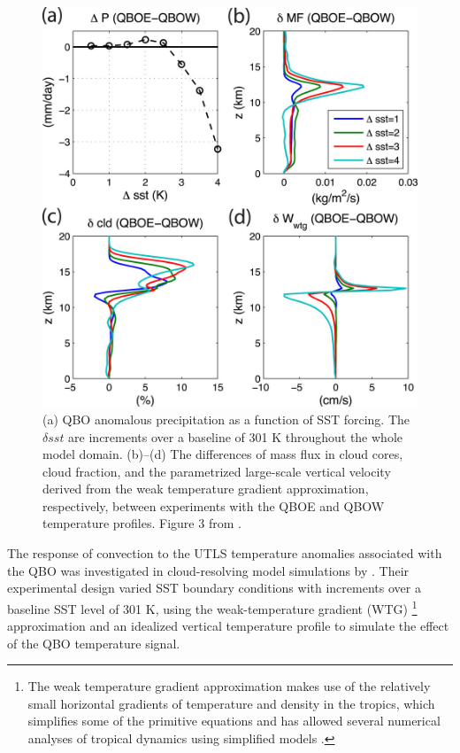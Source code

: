 \begin{figure}[t!]
\centering
\includegraphics[width=0.85\linewidth]{figures/nie_sobel}
\caption[The non-linear relationship of the QBO with SST forcings]{(a) QBO anomalous precipitation as a function of SST forcing. The $\delta sst$ are increments over a baseline of 301 K throughout the whole model domain. (b)–(d) The differences of mass flux in cloud cores, cloud fraction, and the parametrized large-scale vertical velocity derived from the weak temperature gradient approximation, respectively, between experiments with the QBOE and QBOW temperature profiles. Figure 3 from \cite{nie2015}. }
\label{fig:nie}
\end{figure}  


 The response of convection to the UTLS temperature anomalies associated with the QBO was investigated in cloud-resolving model simulations by \cite{nie2015}. Their experimental design varied SST boundary conditions with increments over a baseline SST level of 301 K,  using the weak-temperature gradient (WTG) \footnote{The weak temperature gradient approximation makes use of the relatively small horizontal gradients of temperature and density in the tropics, which simplifies some of the primitive equations and has allowed several numerical analyses of tropical dynamics using simplified models \citep{sobel2001wtg}.} approximation and an idealized vertical temperature profile to simulate the effect of the QBO temperature signal. 
 
